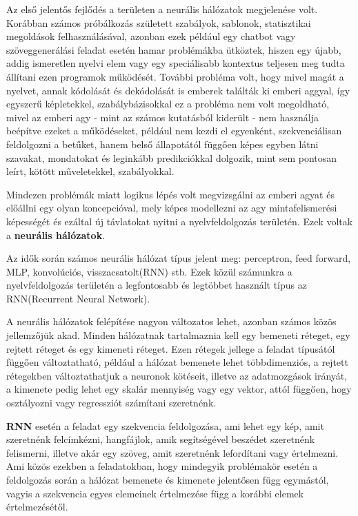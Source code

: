 
Az első jelentős fejlődés a területen a neurális hálózatok megjelenése volt. Korábban számos próbálkozás született szabályok, sablonok, statisztikai megoldások felhasználásával, azonban ezek például egy chatbot vagy szöveggenerálási feladat esetén hamar problémákba ütköztek, hiszen egy újabb, addig ismeretlen nyelvi elem vagy egy speciálisabb kontextus teljesen meg tudta állítani ezen programok működését. További probléma volt, hogy mivel magát a nyelvet, annak kódolását és dekódolását is emberek találták ki emberi aggyal, így egyszerű képletekkel, szabálybázisokkal ez a probléma nem volt megoldható, mivel az emberi agy - mint az számos kutatásból kiderült - nem használja beépítve ezeket a működéseket, például nem kezdi el egyenként, szekvenciálisan feldolgozni a betűket, hanem belső állapotától függően képes egyben látni szavakat, mondatokat és leginkább predikciókkal dolgozik, mint sem pontosan leírt, kötött műveletekkel, szabályokkal.

Mindezen problémák miatt logikus lépés volt megvizsgálni az emberi agyat és előállni egy olyan koncepcióval, mely képes modellezni az agy mintafelismerési képességét és ezáltal új távlatokat nyitni a nyelvfeldolgozás területén. Ezek voltak a \textbf{neurális hálózatok}.

Az idők során számos neurális hálózat típus jelent meg: perceptron, feed forward, MLP, konvolúciós, visszacsatolt(RNN) stb. Ezek közül számunkra a nyelvfeldolgozás területén a legfontosabb és legtöbbet használt típus az RNN(Recurrent Neural Network).

A neurális hálózatok felépítése nagyon változatos lehet, azonban számos közös jellemzőjük akad. Minden hálózatnak tartalmaznia kell egy bemeneti réteget, egy rejtett réteget és egy kimeneti réteget. Ezen rétegek jellege a feladat típusától függően változtatható, például a hálózat bemenete lehet többdimenziós, a rejtett rétegekben változtathatjuk a neuronok kötéseit, illetve az adatmozgások irányát, a kimenete pedig lehet egy skalár mennyiség vagy egy vektor, attól függően, hogy osztályozni vagy regressziót számítani szeretnénk.

\textbf{RNN} esetén a feladat egy szekvencia feldolgozása, ami lehet egy kép, amit szeretnénk felcímkézni, hangfájlok, amik segítségével beszédet szeretnénk felismerni, illetve akár egy szöveg, amit szeretnénk lefordítani vagy értelmezni. Ami közös ezekben a feladatokban, hogy mindegyik problémakör esetén a feldolgozás során a hálózat bemenete és kimenete jelentősen függ egymástól, vagyis a szekvencia egyes elemeinek értelmezése függ a korábbi elemek értelmezésétől.

